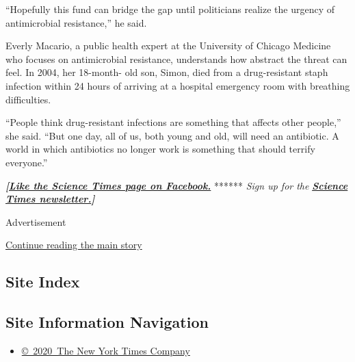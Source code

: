 ``Hopefully this fund can bridge the gap until politicians realize the
urgency of antimicrobial resistance,'' he said.

Everly Macario, a public health expert at the University of Chicago
Medicine who focuses on antimicrobial resistance, understands how
abstract the threat can feel. In 2004, her 18-month- old son, Simon,
died from a drug-resistant staph infection within 24 hours of arriving
at a hospital emergency room with breathing difficulties.

``People think drug-resistant infections are something that affects
other people,'' she said. ``But one day, all of us, both young and old,
will need an antibiotic. A world in which antibiotics no longer work is
something that should terrify everyone.''

\textbf{\emph{{[}}\href{http://on.fb.me/1paTQ1h}{\emph{Like the Science
Times page on Facebook.}}} ****** \emph{\textbar{} Sign up for the}
\textbf{\href{http://nyti.ms/1MbHaRU}{\emph{Science Times
newsletter.}}\emph{{]}}}

Advertisement

\protect\hyperlink{after-bottom}{Continue reading the main story}

\hypertarget{site-index}{%
\subsection{Site Index}\label{site-index}}

\hypertarget{site-information-navigation}{%
\subsection{Site Information
Navigation}\label{site-information-navigation}}

\begin{itemize}
\tightlist
\item
  \href{https://help.nytimes3xbfgragh.onion/hc/en-us/articles/115014792127-Copyright-notice}{©~2020~The
  New York Times Company}
\end{itemize}

